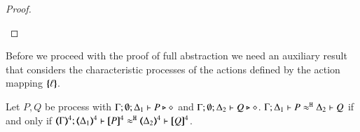 \begin{proof}
\begin{enumerate}[$\bullet$]
	\end{enumerate}
\end{proof}

Before we proceed with the proof of full abstraction we need an auxiliary result
that considers the characteristic processes of the actions defined by the action
mapping $\{\!\!\{\ell\}\!\!\}$.



\begin{proposition}\myrm
	\label{app:prop:fulla_pHOp_to_HOp}
	Let $P, Q$ be \HOpp process with $\Gamma; \emptyset; \Delta_1 \vdash P \triangleright \diamond$ and 
	$\Gamma; \emptyset; \Delta_2 \vdash Q \triangleright \diamond$.
	$\Gamma; \Delta_1 \vdash P \approx^\mathtt{H} \Delta_2 \vdash Q$ if and only if $\horel{\tmap{\Gamma}{4}}{\tmap{\Delta_1}{4}}{\pmap{P}{4}}{\hwb}{\tmap{\Delta_2}{4}}{\pmap{Q}{4}}$.
\end{proposition}

